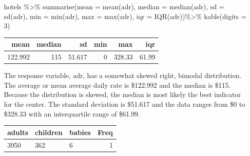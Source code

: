 \documentclass[
]{article}
\newenvironment{Shaded}{\begin{snugshade}}{\end{snugshade}}
\newcommand{\AttributeTok}[1]{\textcolor[rgb]{0.77,0.63,0.00}{#1}}
\newcommand{\DecValTok}[1]{\textcolor[rgb]{0.00,0.00,0.81}{#1}}
\newcommand{\FunctionTok}[1]{\textcolor[rgb]{0.00,0.00,0.00}{#1}}
\newcommand{\NormalTok}[1]{#1}
\newcommand{\OtherTok}[1]{\textcolor[rgb]{0.56,0.35,0.01}{#1}}
\newcommand{\SpecialCharTok}[1]{\textcolor[rgb]{0.00,0.00,0.00}{#1}}
\begin{document}
\begin{Shaded}
\begin{Highlighting}[]
\NormalTok{hotels }\SpecialCharTok{\%\textgreater{}\%}
    \FunctionTok{summarise}\NormalTok{(}\AttributeTok{mean =} \FunctionTok{mean}\NormalTok{(adr), }
              \AttributeTok{median =} \FunctionTok{median}\NormalTok{(adr), }
              \AttributeTok{sd =} \FunctionTok{sd}\NormalTok{(adr),}
              \AttributeTok{min =} \FunctionTok{min}\NormalTok{(adr),}
              \AttributeTok{max =} \FunctionTok{max}\NormalTok{(adr),}
              \AttributeTok{iqr =} \FunctionTok{IQR}\NormalTok{(adr))}\SpecialCharTok{\%\textgreater{}\%}
\FunctionTok{kable}\NormalTok{(}\AttributeTok{digits =} \DecValTok{3}\NormalTok{)}
\end{Highlighting}
\end{Shaded}

\begin{longtable}[]{@{}rrrrrr@{}}
\toprule
mean & median & sd & min & max & iqr \\
\midrule
\endhead
122.992 & 115 & 51.617 & 0 & 328.33 & 61.99 \\
\bottomrule
\end{longtable}

The response variable, adr, has a somewhat skewed right, bimodal
distribution. The average or mean average daily rate is \$122.992 and
the median is \$115. Because the distribution is skewed, the median is
most likely the best indicator for the center. The standard deviation is
\$51.617 and the data ranges from \$0 to \$328.33 with an interquartile
range of \$61.99.

\begin{Shaded}
\end{Shaded}

\begin{longtable}[]{@{}lllr@{}}
\toprule
adults & children & babies & Freq \\
\midrule
\endhead
3950 & 362 & 6 & 1 \\
\bottomrule
\end{longtable}
\end{document}
